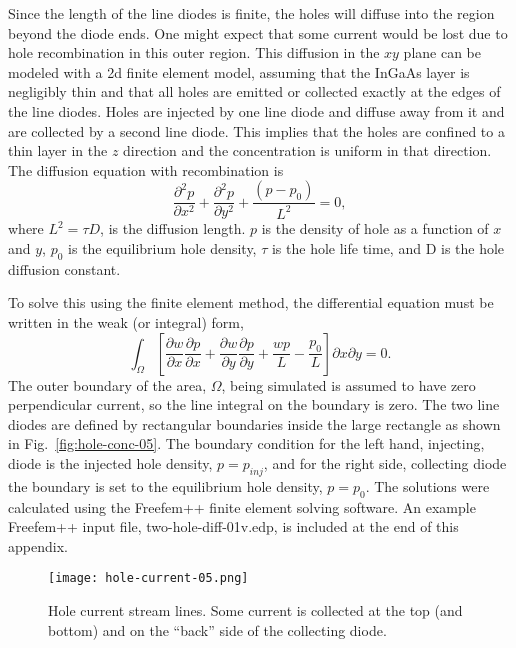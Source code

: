Since the length of the line diodes is finite, the holes will diffuse
into the region beyond the diode ends.
One might expect that some current would be lost due to hole recombination
in this outer region.
This diffusion in the $xy$ plane can be modeled with a 2d finite element
model, assuming that the InGaAs layer is negligibly thin and that
all holes are emitted or collected exactly at the edges of the line diodes. 
Holes are injected by one line diode and diffuse away from it
 and are collected by a second line diode.  
 This implies that the
holes are confined to a thin layer in the $z$ direction and the
concentration is uniform in that direction.
The diffusion equation with recombination is
\begin{equation}
\frac{\partial^2p}{\partial x^2}+\frac{\partial^2p}{\partial y^2}
     + \frac{(p-p_0)}{L^2}=0,
\end{equation} 
where $L^2=\tau D$, is the diffusion length.
$p$ is the density of hole as a function of $x$ and $y$, $p_0$ is
the equilibrium hole density, 
$\tau$ is the hole life time, and D is the hole diffusion constant.

To solve this using the finite element method, the differential
 equation must be written in the weak (or integral) form,
\begin{equation}
\int_\Omega \left[ \frac{\partial w}{\partial x}\frac{\partial p}{\partial x}
    +  \frac{\partial w}{\partial y}\frac{\partial p}{\partial y}
    + \frac{wp}{L} - \frac{p_0}{L} \right]\partial x \partial y = 0.
\end{equation} 
The outer boundary of the area, $\Omega$, being simulated is assumed to
 have zero perpendicular current, so the line integral on the boundary is zero.
The two line diodes are defined by rectangular boundaries inside
 the large rectangle as shown in
 Fig.~\ref{fig:hole-conc-05}.
The boundary condition for the left hand, injecting, diode is the
injected hole density, $p=p_{inj}$, and for the right side, collecting
diode the boundary is set to the equilibrium hole density, $p=p_0$.
The solutions were calculated using the Freefem++ finite element
solving software.\cite{freefem}
An example Freefem++ input file, two-hole-diff-01v.edp, is included at the
end of this appendix.

\begin{figure}[t]
\centering
\texttt{[image: hole-current-05.png]}
\caption{Hole current stream lines.  Some current is collected at
 the top (and bottom) and on the ``back'' side of the collecting
diode.}%
\label{fig:hole-current-05}
\end{figure}

